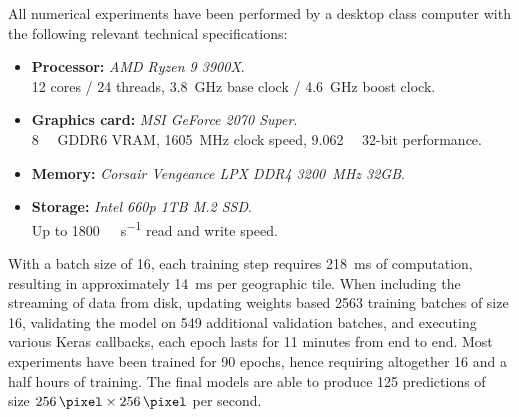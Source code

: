 All numerical experiments have been performed by a desktop class computer with the following relevant technical specifications:

\begin{itemize}[nosep]
  \item \textbf{Processor:} \textit{AMD Ryzen 9 3900X}. \\
    12 cores / 24 threads, \SI{3.8}{\giga\hertz} base clock / \SI{4.6}{\giga\hertz} boost clock.
  \item \textbf{Graphics card:} \textit{MSI GeForce 2070 Super}. \\
    \SI{8}{\giga\byte} GDDR6 VRAM, \SI{1605}{\mega\hertz} clock speed, \SI{9.062}{\tera\flops} 32-bit performance.
  \item \textbf{Memory:} \textit{Corsair Vengeance LPX DDR4 \SI{3200}{\mega\hertz} 32GB}.
  \item \textbf{Storage:} \textit{Intel 660p 1TB M.2 SSD}. \\
    Up to \SI{1800}{\mega\byte\per\second} read and write speed.
\end{itemize}

\begin{wrapfigure}[9]{r}{.4\textwidth}
  \vspace{-0.75\baselineskip}
\end{wrapfigure}

With a batch size of 16, each training step requires \SI{218}{\milli\second} of computation, resulting in approximately \SI{14}{\milli\second} per geographic tile.
When including the streaming of data from disk, updating weights based \num{2563} training batches of size 16, validating the model on \num{549} additional validation batches, and executing various Keras callbacks, each epoch lasts for 11 minutes from end to end.
Most experiments have been trained for 90 epochs, hence requiring altogether 16 and a half hours of training.
The final models are able to produce 125 predictions of size $\SI{256}{\pixel} \times \SI{256}{\pixel}$ per second.
